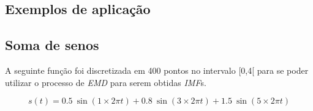 \documentclass[letterpaper]{article}
\begin{document}
\begin{multicols}{2}

\section{Exemplos de aplicação}
\label{sec:exemplos}

\subsection{Soma de senos}

\par A seguinte função foi discretizada em 400 pontos no intervalo [0,4[ para se poder utilizar o processo de \textit{EMD} para serem obtidas \textit{IMF}s.

\begin{equation*}
    s(t) = 0.5 \: \sin (1 \times 2 \pi t) + 0.8 \: \sin (3 \times 2 \pi t) +  1.5 \: \sin (5 \times 2 \pi t)
\end{equation*}


\end{multicols}
\end{document}
